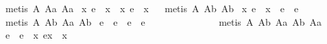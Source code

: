 \begin{isabellebody}
%
\isadelimproof
%
\endisadelimproof
%
\isatagproof
{}\isamarkupfalse%
\ {\isacharparenleft}metis\ A{}\ A{}a\ A{}a{\isacharparenright}%
\endisatagproof
{\isafoldproof}%
%
\isadelimproof
\isanewline
%
\endisadelimproof
\isanewline
\isanewline
{}\isamarkupfalse%
\ {\isachardoublequoteopen}{\isacharparenleft}\isactrlbold {\isasymexists}x{\isachardot}\ e\ {\isasymapprox}\ {\isacharparenleft}{\isasymbox}x{\isacharparenright}{\isacharparenright}\ \isactrlbold {\isasymleftrightarrow}\ {\isacharparenleft}\isactrlbold {\isasymexists}x{\isachardot}\ e\ {\isasymapprox}\ {\isacharparenleft}x{\isasymbox}{\isacharparenright}{\isacharparenright}{\isachardoublequoteclose}%
\isadelimproof
\ %
\endisadelimproof
%
\isatagproof
{}\isamarkupfalse%
\ {\isacharparenleft}metis\ A{}\ A{}b\ A{}b{\isacharparenright}%
\endisatagproof
{\isafoldproof}%
%
\isadelimproof
%
\endisadelimproof
\isanewline
{}\isamarkupfalse%
\ {\isachardoublequoteopen}{\isacharparenleft}\isactrlbold {\isasymexists}x{\isachardot}\ e\ {\isasymapprox}\ {\isacharparenleft}x{\isasymbox}{\isacharparenright}{\isacharparenright}\ \isactrlbold {\isasymleftrightarrow}\ e\ {\isasymapprox}\ {\isacharparenleft}{\isasymbox}e{\isacharparenright}{\isachardoublequoteclose}%
\isadelimproof
\ \ \ \ \ \ \ %
\endisadelimproof
%
\isatagproof
{}\isamarkupfalse%
\ {\isacharparenleft}metis\ A{}\ A{}b\ A{}a\ A{}b{\isacharparenright}%
\endisatagproof
{\isafoldproof}%
%
\isadelimproof
%
\endisadelimproof
\isanewline
{}\isamarkupfalse%
\ {\isachardoublequoteopen}e\ {\isasymapprox}\ {\isacharparenleft}{\isasymbox}e{\isacharparenright}\ \isactrlbold {\isasymleftrightarrow}\ e\ {\isasymapprox}\ {\isacharparenleft}e{\isasymbox}{\isacharparenright}{\isachardoublequoteclose}%
\isadelimproof
\ \ \ \ \ \ \ \ \ \ \ \ \ %
\endisadelimproof
%
\isatagproof
{}\isamarkupfalse%
\ {\isacharparenleft}metis\ A{}\ A{}b\ A{}a\ A{}b\ A{}a{\isacharparenright}%
\endisatagproof
{\isafoldproof}%
%
\isadelimproof
%
\endisadelimproof
\isanewline
{}\isamarkupfalse%
\ {\isachardoublequoteopen}e\ {\isasymapprox}\ {\isacharparenleft}e{\isasymbox}{\isacharparenright}\ \isactrlbold {\isasymleftrightarrow}\ {\isacharparenleft}\isactrlbold {\isasymforall}x{\isachardot}\ e{\isasymcdot}x\ {\isasymgreaterapprox}\ x{\isacharparenright}{\isachardoublequoteclose}%
\isadelimproof
\ \ \ \ \ \ \ \ \ %

\end{isabellebody}
